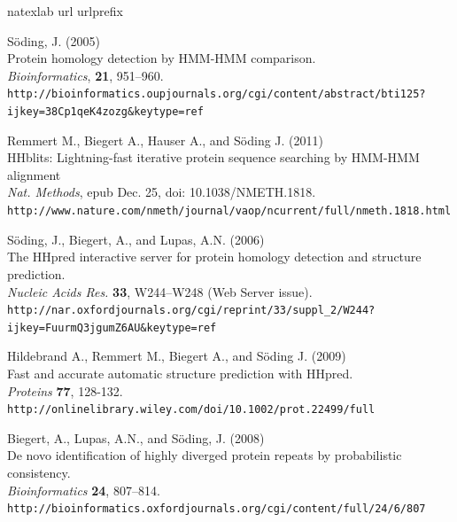 \documentclass[11pt,a4paper]{article}
\begin{document}
\begin{thebibliography}{31}

\expandafter\ifx\csname natexlab\endcsname\relax\def\natexlab#1{#1}\fi
\expandafter\ifx\csname url\endcsname\relax
  \def\url#1{\texttt{#1}}\fi
\expandafter\ifx\csname urlprefix\endcsname\relax\def\urlprefix{URL }\fi

S\"oding, J. (2005)\\
{Protein homology detection by HMM-HMM comparison.}\\
\newblock \emph{Bioinformatics}, \textbf{21}, 951--960.\\
\newblock \url{http://bioinformatics.oupjournals.org/cgi/content/abstract/bti125?ijkey=38Cp1qeK4zozg&keytype=ref}

Remmert M., Biegert A., Hauser A., and S\"oding J. (2011)\\
{HHblits: Lightning-fast iterative protein sequence searching by HMM-HMM alignment}\\
\newblock \emph{Nat. Methods}, epub Dec. 25, doi: 10.1038/NMETH.1818.\\
\newblock \url{http://www.nature.com/nmeth/journal/vaop/ncurrent/full/nmeth.1818.html}

S\"oding, J., Biegert, A., and Lupas, A.N. (2006)\\
{The HHpred interactive server for protein homology detection and structure prediction.}\\
\newblock \emph{Nucleic Acids Res.} \textbf{33}, W244--W248 (Web Server issue).\\
\newblock \url{http://nar.oxfordjournals.org/cgi/reprint/33/suppl_2/W244?ijkey=FuurmQ3jgumZ6AU&keytype=ref}

Hildebrand A., Remmert M., Biegert A., and S\"oding J. (2009)\\
{Fast and accurate automatic structure prediction with HHpred.}\\
\newblock \emph{Proteins} \textbf{77}, 128-132.\\
\newblock \url{http://onlinelibrary.wiley.com/doi/10.1002/prot.22499/full}

Biegert, A., Lupas, A.N., and S\"oding, J. (2008)\\
{De novo identification of highly diverged protein repeats by probabilistic consistency.}\\
\newblock \emph{Bioinformatics} \textbf{24}, 807--814.\\
\newblock \url{http://bioinformatics.oxfordjournals.org/cgi/content/full/24/6/807}


\end{thebibliography}
\end{document}
